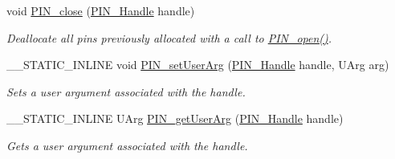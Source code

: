 \begin{DoxyCompactItemize}
void \hyperlink{_p_i_n_8h_a877e82b9c5333a122cc408e103feba68}{P\+I\+N\+\_\+close} (\hyperlink{_p_i_n_8h_afb2de52b054638f63c39df1f30a0d88d}{P\+I\+N\+\_\+\+Handle} handle)
\begin{DoxyCompactList}\small\item\em Deallocate all pins previously allocated with a call to \hyperlink{_p_i_n_8h_a731c5bb641ffeb064579432adfc8dba0}{P\+I\+N\+\_\+open()}. \end{DoxyCompactList}\item 
\+\_\+\+\_\+\+S\+T\+A\+T\+I\+C\+\_\+\+I\+N\+L\+I\+N\+E void \hyperlink{_p_i_n_8h_a7bbac83f5f9e2cdee6eac5055247f666}{P\+I\+N\+\_\+set\+User\+Arg} (\hyperlink{_p_i_n_8h_afb2de52b054638f63c39df1f30a0d88d}{P\+I\+N\+\_\+\+Handle} handle, U\+Arg arg)
\begin{DoxyCompactList}\small\item\em Sets a user argument associated with the handle. \end{DoxyCompactList}\item 
\+\_\+\+\_\+\+S\+T\+A\+T\+I\+C\+\_\+\+I\+N\+L\+I\+N\+E U\+Arg \hyperlink{_p_i_n_8h_a8761c09ec22161bf6f46f491a8e547fd}{P\+I\+N\+\_\+get\+User\+Arg} (\hyperlink{_p_i_n_8h_afb2de52b054638f63c39df1f30a0d88d}{P\+I\+N\+\_\+\+Handle} handle)
\begin{DoxyCompactList}\small\item\em Gets a user argument associated with the handle. \end{DoxyCompactList}\end{DoxyCompactItemize}
